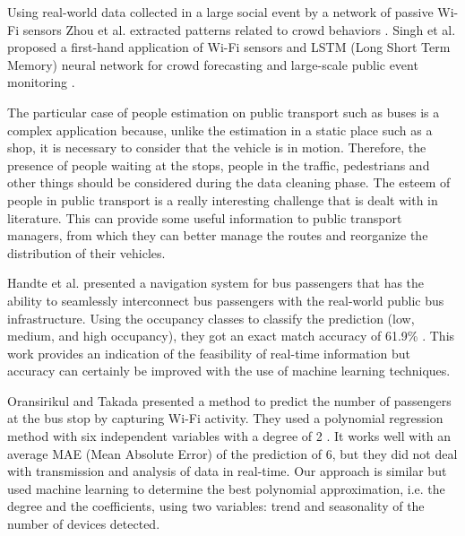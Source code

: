 Using real-world data collected in a large social event by a network of passive Wi-Fi sensors Zhou et al. extracted patterns related to crowd behaviors \cite{zhou2020understanding}.
Singh et al. proposed a first-hand application of Wi-Fi sensors and LSTM (Long Short Term Memory) neural network for crowd forecasting and large-scale public event monitoring \cite{singh2020crowd}.

The particular case of people estimation on public transport such as buses is a complex application because, unlike the estimation in a static place such as a shop, it is necessary to consider that the vehicle is in motion. Therefore, the presence of people waiting at the stops, people in the traffic, pedestrians and other things should be considered during the data cleaning phase. The esteem of people in public transport is a really interesting challenge that is dealt with in literature. This can provide some useful information to public transport managers, from which they can better manage the routes and reorganize the distribution of their vehicles.

Handte et al. presented a navigation system for bus passengers that has the ability to seamlessly interconnect bus passengers with the real-world public bus infrastructure. Using the occupancy classes to classify the prediction (low, medium, and high occupancy), they got an exact match accuracy of 61.9\% \cite{handte2016internet}. This work provides an indication of the feasibility of real-time information but accuracy can certainly be improved with the use of machine learning techniques.

Oransirikul and Takada presented a method to predict the number of passengers at the bus stop by capturing Wi-Fi activity. They used a polynomial regression method with six independent variables with a degree of 2 \cite{oransirikul2019practicability}. It works well with an average MAE (Mean Absolute Error) of the prediction of 6, but they did not deal with transmission and analysis of data in real-time.
Our approach is similar but used machine learning to determine the best polynomial approximation, i.e. the degree and the coefficients, using two variables: trend and seasonality of the number of devices detected.
